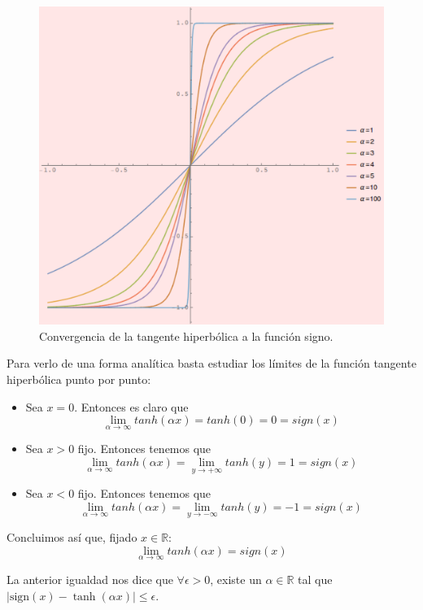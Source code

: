 \documentclass[a4paper, 11pt]{article}
\begin{document}
\begin{solucion}
\begin{solucion}
          \begin{figure}[!htb]
              \centering
              \includegraphics[scale=0.5]{tanh.pdf}
              \caption{Convergencia de la tangente hiperbólica a la función signo.}
              \label{img:tanh}
          \end{figure}

          Para verlo de una forma analítica basta estudiar los límites de la función tangente hiperbólica punto por punto:
          \begin{itemize}
              \item Sea $x = 0$. Entonces es claro que \[\lim_{\alpha\to\infty} tanh(\alpha x) = tanh(0) = 0 = sign(x)\]
              \item Sea $x > 0$ fijo. Entonces tenemos que \[\lim_{\alpha\to\infty} tanh(\alpha x) = \lim_{y\to+\infty} tanh(y) = 1 = sign(x)\]
              \item Sea $x < 0$ fijo. Entonces tenemos que \[\lim_{\alpha\to\infty} tanh(\alpha x) = \lim_{y\to-\infty} tanh(y) = -1 = sign(x)\]
          \end{itemize}
          Concluimos así que, fijado $x\in\mathbb{R}$:
          \[
          \lim_{\alpha\to\infty} tanh(\alpha x) = sign(x)
          \]

          La anterior igualdad nos dice que $\forall \epsilon>0$, existe un $\alpha \in \mathbb{R}$ tal que $\vert\mathrm{sign}(x) - \tanh(\alpha x)\vert \leq \epsilon$.


\end{solucion}
\end{solucion}
\end{document}
